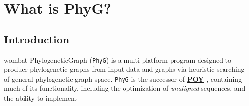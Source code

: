 \documentclass[11pt]{book}
\begin{document}
	\tableofcontents

\chapter{What is PhyG?}

\section{Introduction}
	wombat
	PhylogeneticGraph (\texttt{PhyG}) \citep{Wheeleretal2024} is a multi-platform program designed to produce phylogenetic 
	graphs from input data and graphs via heuristic searching of general phylogenetic graph 
	space. \texttt{PhyG} is the successor of \href{https://github.com/wardwheeler/POY5}{\textbf{POY}}
	\citep{POY2,POY3,POY4,Varonetal2010,POY5, Wheeleretal2015}, containing much of its 
	functionality, including the optimization of \textit{unaligned} sequences, and the ability to implement 
\end{document}
